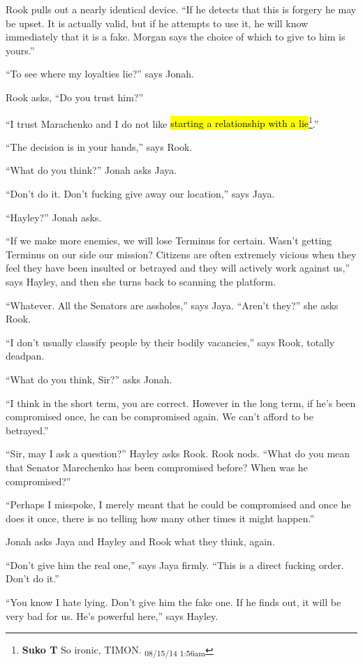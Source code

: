 Rook pulls out a nearly identical device.  ``If he detects that this is forgery he may be upset.  It is actually valid, but if he attempts to use it, he will know immediately that it is a fake.  Morgan says the choice of which to give to him is yours.''

``To see where my loyalties lie?'' says Jonah.   

Rook asks, ``Do you trust him?''

``I trust Marachenko and I do not like \hl{starting a relationship with a lie}\footnote{\textbf{Suko T }So ironic, TIMON. \textsubscript{08/15/14 1:56am}}.''

``The decision is in your hands,'' says Rook.

``What do you think?'' Jonah asks Jaya.

``Don't do it.  Don't fucking give away our location,'' says Jaya.

``Hayley?'' Jonah asks.

``If we make more enemies, we will lose Terminus for certain.  Wasn't getting Terminus on our side our mission?  Citizens are often extremely vicious when they feel they have been insulted or betrayed and they will actively work against us,'' says Hayley, and then she turns back to scanning the platform.

``Whatever. All the Senators are assholes,'' says Jaya.  ``Aren't they?'' she asks Rook.

``I don't usually classify people by their bodily vacancies,'' says Rook, totally deadpan.

``What do you think, Sir?'' asks Jonah.

``I think in the short term, you are correct.  However in the long term, if he's been compromised once, he can be compromised again.  We can't afford to be betrayed.''

``Sir, may I ask a question?'' Hayley asks Rook.  Rook nods.  ``What do you mean that Senator Marechenko has been compromised before?  When was he compromised?''

``Perhaps I misspoke, I merely meant that he could be compromised and once he does it once, there is no telling how many other times it might happen.''

Jonah asks Jaya and Hayley and Rook what they think, again.

``Don't give him the real one,'' says Jaya firmly.  ``This is a direct fucking order.  Don't do it.''

``You know I hate lying.  Don't give him the fake one.  If he finds out, it will be very bad for us.  He's powerful here,'' says Hayley. 

